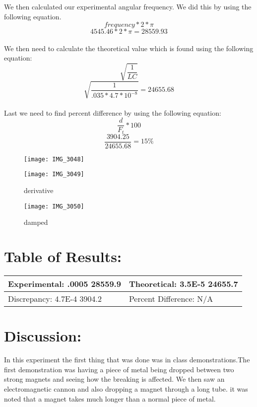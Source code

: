 \documentclass{article}
\begin{document}
We then calculated our experimental angular frequency.  We did this by using the following equation.
\[frequency * 2 * \pi\]
\[4545.46 * 2 * \pi = 28559.93\]
\\
We then need to calculate the theoretical value which is found using the following equation:
\[\sqrt{\frac{1}{LC}}\]
\[\sqrt{\frac{1}{.035 * 4.7*10^{-8}}}=24655.68\]
\\
Last we need to find percent difference by using the following equation:
\[\frac{d}{F_t}*100\]
\[\frac{3904.25}{24655.68} = 15\%\]

\begin{figure}[h]
\caption{}
\centering
\texttt{[image: IMG\_3048]}
\end{figure}

\begin{figure}[h]
\caption{derivative}
\centering
\texttt{[image: IMG\_3049]}
\end{figure}

\begin{figure}[h!]
\caption{damped}
\centering
\texttt{[image: IMG\_3050]}
\end{figure}

\newpage
\section*{Table of Results:}
\begin{center}
\begin{tabular}{|l|l|}
\hline
	Experimental: .0005 28559.9 & Theoretical: 3.5E-5 24655.7 \\ \hline
	Discrepancy: 4.7E-4 3904.2   & Percent Difference: N/A \\
\hline
\end{tabular}
\end{center}

\section*{Discussion:}
\doublespace
In this experiment the first thing that was done was in class demonstrations.The first demonstration was having a piece of metal being dropped between two strong magnets and seeing how the breaking is affected.  We then saw an electromagnetic cannon and also dropping a magnet through a long tube.  it was noted that a magnet takes much longer than a normal piece of metal.
\end{document}

